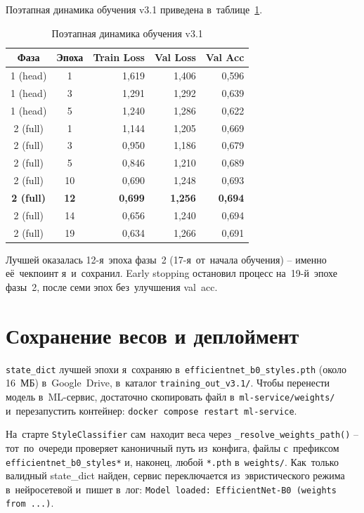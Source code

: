 \documentclass[a4paper,12pt]{diplom}
\begin{document}
Поэтапная динамика обучения v3.1 приведена в~таблице~\ref{tab:training}.

\begin{table}[!ht]
\caption{Поэтапная динамика обучения v3.1}
\label{tab:training}
\centering
\begin{tabular}{ccrrr}
\toprule
\textbf{Фаза} & \textbf{Эпоха} & \textbf{Train Loss} & \textbf{Val Loss} & \textbf{Val Acc} \\
\midrule
1 (head)  &  1 & 1{,}619 & 1{,}406 & 0{,}596 \\
1 (head)  &  3 & 1{,}291 & 1{,}292 & 0{,}639 \\
1 (head)  &  5 & 1{,}240 & 1{,}286 & 0{,}622 \\
2 (full)  &  1 & 1{,}144 & 1{,}205 & 0{,}669 \\
2 (full)  &  3 & 0{,}950 & 1{,}186 & 0{,}679 \\
2 (full)  &  5 & 0{,}846 & 1{,}210 & 0{,}689 \\
2 (full)  & 10 & 0{,}690 & 1{,}248 & 0{,}693 \\
\textbf{2 (full)} & \textbf{12} & \textbf{0{,}699} & \textbf{1{,}256} & \textbf{0{,}694} \\
2 (full)  & 14 & 0{,}656 & 1{,}240 & 0{,}694 \\
2 (full)  & 19 & 0{,}634 & 1{,}266 & 0{,}691 \\
\bottomrule
\end{tabular}
\end{table}

Лучшей оказалась 12-я~эпоха фазы~2 (17-я~от~начала обучения) -- именно её~чекпоинт я~и~сохранил. Early stopping остановил процесс на~19-й~эпохе фазы~2, после семи эпох без~улучшения val~acc.

\section{Сохранение весов и деплоймент}
\label{sec:deploy}

\texttt{state\_dict} лучшей эпохи я~сохраняю в~\verb|efficientnet_b0_styles.pth| (около 16~МБ) в~Google~Drive, в~каталог \verb|training_out_v3.1/|. Чтобы перенести модель в~ML-сервис, достаточно скопировать файл в~\verb|ml-service/weights/| и~перезапустить контейнер: \verb|docker compose restart ml-service|.

На~старте \texttt{StyleClassifier} сам~находит веса через \verb|_resolve_weights_path()| -- тот~по~очереди проверяет каноничный путь из~конфига, файлы с~префиксом \verb|efficientnet_b0_styles*| и, наконец, любой \verb|*.pth| в~\verb|weights/|. Как~только валидный state\_dict найден, сервис переключается из~эвристического режима в~нейросетевой и~пишет в~лог: \verb|Model loaded: EfficientNet-B0 (weights from ...)|.
\end{document}
